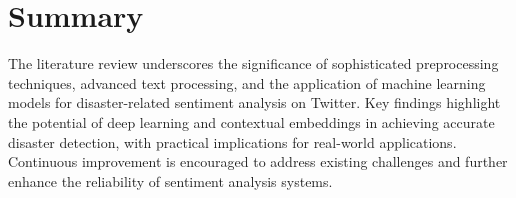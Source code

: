 \section{Summary} 
The literature review underscores the significance of sophisticated preprocessing techniques, advanced text processing, and the application of machine learning models for disaster-related sentiment analysis on Twitter. Key findings highlight the potential of deep learning and contextual embeddings in achieving accurate disaster detection, with practical implications for real-world applications. Continuous improvement is encouraged to address existing challenges and further enhance the reliability of sentiment analysis systems.
